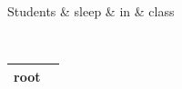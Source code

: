 \documentclass[t]{beamer}
\begin{document}
\begin{frame}
{\begin{varwidth}{2.3\linewidth}
{\begin{dependency}
\begin{deptext}[column sep=.7cm]
	Students \& sleep \& in \& class \\
	\end{deptext}
	\end{dependency}
	\\
	\begin{tabular}{|l|l|}\hline
	\color{red} root \\ \hline
	\end{tabular}
	\hspace{44mm}
	\begin{tabular}{|l|}\hline
	\quad \\ \hline
	\end{tabular}
	}
    \end{varwidth}
	}
\end{frame}
\end{document}

